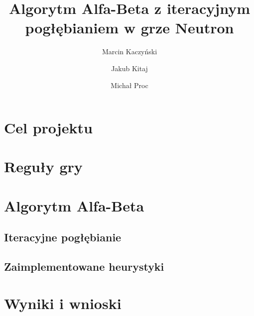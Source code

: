 \documentclass[a4paper,12pt]{article}
\title{Algorytm Alfa-Beta z iteracyjnym pogłębianiem w grze Neutron}
\author{Marcin Kaczyński \and Jakub Kitaj \and Michał Proc}
\begin{document}
\maketitle

\section{Cel projektu}
\section{Reguły gry}
\section{Algorytm Alfa-Beta}
\subsection{Iteracyjne pogłębianie}
\subsection{Zaimplementowane heurystyki}
\section{Wyniki i wnioski}
\end{document}
